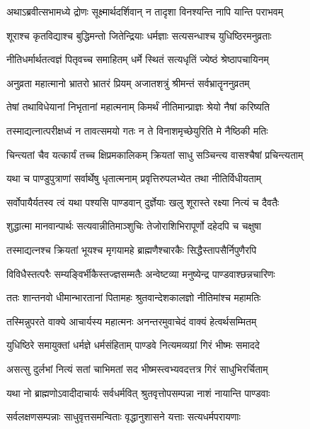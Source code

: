 \twolineshloka
{अथाऽब्रवीत्सभामध्ये द्रोणः सूक्ष्मार्थदर्शिवान्}
{न तादृशा विनश्यन्ति नापि यान्ति पराभवम्}


\twolineshloka
{शूराश्च कृतविद्याश्च बुद्धिमन्तो जितेन्द्रियाः}
{धर्मज्ञाः सत्यसन्धाश्च युधिष्ठिरमनुव्रताः}


\twolineshloka
{नीतिधर्मार्थतत्वज्ञं पितृवच्च समाहितम्}
{धर्मे स्थितं सत्यधृतिं ज्येष्ठं श्रेष्ठापचायिनम्}


\twolineshloka
{अनुव्रता महात्मानो भ्रातरो भ्रातरं प्रियम्}
{अजातशत्रुं श्रीमन्तं सर्वभ्रातॄननुव्रतम्}


\twolineshloka
{तेषां तथाविधेयानां निभृतानां महात्मनाम्}
{किमर्थं नीतिमान्प्राज्ञः श्रेयो नैषां करिष्यति}


\twolineshloka
{तस्माद्यत्नात्परीक्षध्वं न तावत्समयो गतः}
{न ते विनाशमृच्छेयुरिति मे नैष्ठिकी मतिः}


\twolineshloka
{चिन्त्यतां चैव यत्कार्यं तच्च क्षिप्रमकालिकम्}
{क्रियतां साधु सञ्चिन्त्य वासश्चैषां प्रचिन्त्यताम्}


\twolineshloka
{यथा च पाण्डुपुत्राणां सर्वार्थेषु धृतात्मनाम्}
{प्रवृत्तिरुपलभ्येत तथा नीतिर्विधीयताम्}


\twolineshloka
{सर्वोपायैर्यतस्व त्वं यथा पश्यसि पाण्डवान्}
{दुर्ज्ञेयाः खलु शूरास्ते रक्ष्या नित्यं च दैवतैः}


\twolineshloka
{शुद्धात्मा मानवान्पार्थः सत्यवान्नीतिमाञ्शुचिः}
{तेजोराशिभिरापूर्णो दहेदपि च चक्षुषा}


\twolineshloka
{तस्माद्यत्नश्च क्रियतां भूयश्च मृगयामहे}
{ब्राह्मणैश्चारकैः सिद्धैस्तापसैर्निपुणैरपि}


\twolineshloka
{विविधैस्तत्परैः सम्यङ्विर्भीकैस्तज्ज्ञसम्मतैः}
{अन्वेष्टव्या मनुष्येन्द्र पाण्डवाश्छन्नचारिणः}


\twolineshloka
{ततः शान्तनवो धीमान्भारतानां पितामहः}
{श्रुतवान्देशकालज्ञो नीतिमांश्च महामतिः}


\twolineshloka
{तस्मिन्नुपरते वाक्ये आचार्यस्य महात्मनः}
{अनन्तरमुवाचेदं वाक्यं हेत्वर्थसम्मितम्}


\twolineshloka
{युधिष्ठिरे समायुक्तां धर्मज्ञे धर्मसंहिताम्}
{पाण्डवे नित्यमव्यग्रां गिरं भीष्मः समाददे}


\twolineshloka
{असत्सु दुर्लभां नित्यं सतां चाभिमतां सद}
{भीष्मस्त्वभ्यवदत्तत्र गिरं साधुभिरर्चिताम्}


\twolineshloka
{यथा नो ब्राह्मणोऽवादीदाचार्यः सर्वधर्मवित्}
{श्रुतवृत्तोपसम्पन्ना नाशं नायान्ति पाण्डवाः}


\twolineshloka
{सर्वलक्षणसम्पन्नाः साधुवृत्तसमन्विताः}
{वृद्धानुशासने यत्ताः सत्यधर्मपरायणाः}


